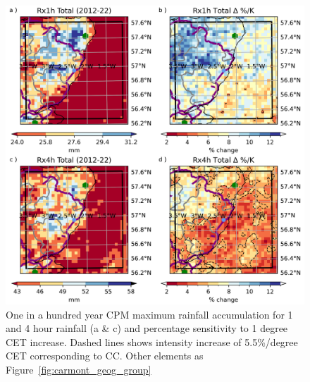\documentclass[11pt,a4paper]{article}
\begin{document}
    
\begin{figure}
\centering
\includegraphics[width=1\linewidth]{cpm_intensity_delta}
\caption{One in a hundred year CPM maximum rainfall accumulation for 1 and 4 hour rainfall (a \& c) and percentage sensitivity to 1 degree CET increase. Dashed lines shows intensity increase of 5.5\%/degree CET corresponding to CC. Other elements as Figure~\ref{fig:carmont_geog_group}  }
\label{fig:map_intensity}
\end{figure}
\end{document}
